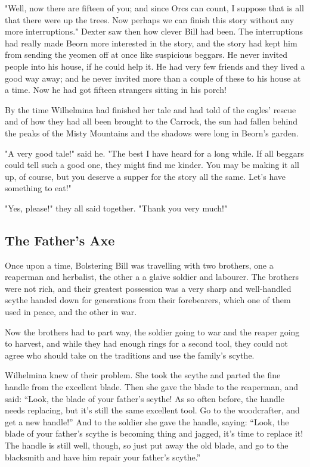 \documentclass[twoside,11pt,b5paper,twocolumn]{scrbook}
\begin{document}
"Well, now there are fifteen of you; and since Orcs can count, I suppose that is all that there were up the trees. Now perhaps we can finish this story without any more interruptions." Dexter saw then how clever Bill had been. The interruptions had really made Beorn more interested in the story, and the story had kept him from sending the yeomen off at once like suspicious beggars. He never invited people into his house, if he could help it. He had very few friends and they lived a good way away; and he never invited more than a couple of these to his house at a time. Now he had got fifteen strangers sitting in his porch!

By the time Wilhelmina had finished her tale and had told of the eagles' rescue and of how they had all been brought to the Carrock, the sun had fallen behind the peaks of the Misty Mountains and the shadows were long in Beorn's garden.

"A very good tale!" said he. "The best I have heard for a long while. If all beggars could tell such a good one, they might find me kinder. You may be making it all up, of course, but you deserve a supper for the story all the same. Let's have something to eat!"

"Yes, please!" they all said together. "Thank you very much!"

\subsection{The Father's Axe}
Once upon a time, Bolstering Bill was travelling with two brothers, one a reaperman and herbalist, the other a a glaive soldier and labourer. The brothers were not rich, and their greatest possession was a very sharp and well-handled scythe handed down for generations from their forebearers, which one of them used in peace, and the other in war.

Now the brothers had to part way, the soldier going to war and the reaper going to harvest, and while they had enough rings for a second tool, they could not agree who should take on the traditions and use the family's scythe.

Wilhelmina knew of their problem. She took the scythe and parted the fine handle from the excellent blade. Then she gave the blade to the reaperman, and said: “Look, the blade of your father's scythe! As so often before, the handle needs replacing, but it's still the same excellent tool. Go to the woodcrafter, and get a new handle!” And to the soldier she gave the handle, saying: “Look, the blade of your father's scythe is becoming thing and jagged, it's time to replace it! The handle is still well, though, so just put away the old blade, and go to the blacksmith and have him repair your father's scythe.”
\end{document}
